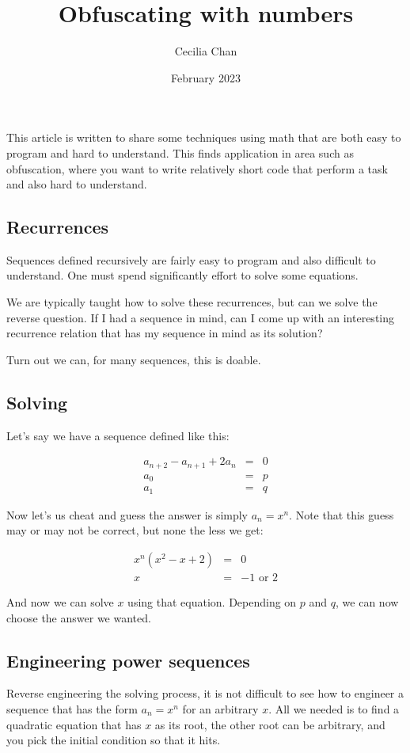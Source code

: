 \documentclass{article}
\title{Obfuscating with numbers}
\author{Cecilia Chan}
\date{February 2023}
\begin{document}
\maketitle
This article is written to share some techniques using math that are both easy to program and hard to understand. This finds application in area such as obfuscation, where you want to write relatively short code that perform a task and also hard to understand.

\subsection*{Recurrences}
Sequences defined recursively are fairly easy to program and also difficult to understand. One must spend significantly effort to solve some equations.

We are typically taught how to solve these recurrences, but can we solve the reverse question. If I had a sequence in mind, can I come up with an interesting recurrence relation that has my sequence in mind as its solution?

Turn out we can, for many sequences, this is doable.

\subsection*{Solving}
Let's say we have a sequence defined like this:

\begin{eqnarray*}
  a_{n+2} - a_{n+1} + 2a_n &=& 0 \\
  a_0 &=& p \\
  a_1 &=& q
\end{eqnarray*}

Now let's us cheat and guess the answer is simply $ a_n = x^n $. Note that this guess may or may not be correct, but none the less we get:

\begin{eqnarray*}
  x^n(x^2 - x + 2) &=& 0 \\
  x &=& -1 \text{ or } 2
\end{eqnarray*}

And now we can solve $ x $ using that equation. Depending on $ p $ and $ q $, we can now choose the answer we wanted.

\subsection*{Engineering power sequences}
Reverse engineering the solving process, it is not difficult to see how to engineer a sequence that has the form $ a_n = x^n $ for an arbitrary $ x $. All we needed is to find a quadratic equation that has $ x $ as its root, the other root can be arbitrary, and you pick the initial condition so that it hits.
\end{document}

